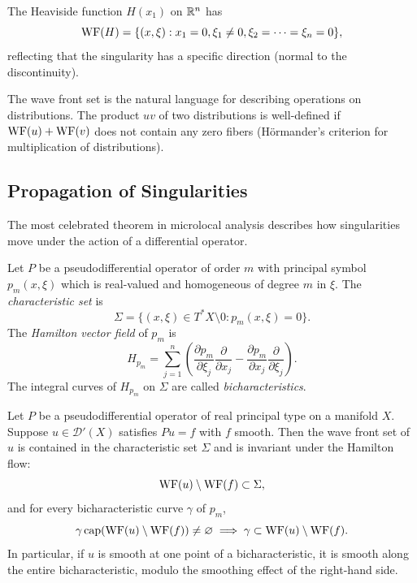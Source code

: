 \begin{example}
The Heaviside function \(H(x_1)\) on \(\mathbb{R}^n\) has
\[
\operatorname{WF}(H) = \{(x, \xi) : x_1 = 0, \xi_1 \neq 0, \xi_2 = \cdots = \xi_n = 0\},
\]
reflecting that the singularity has a specific direction (normal to
the discontinuity).
\end{example}

The wave front set is the natural language for describing operations on
distributions. The product \(uv\) of two distributions is well-defined
if \(\operatorname{WF}(u) + \operatorname{WF}(v)\) does not contain any zero fibers (H\"ormander's
criterion for multiplication of distributions).

\subsection{Propagation of Singularities}

The most celebrated theorem in microlocal analysis describes how
singularities move under the action of a differential operator.

Let \(P\) be a pseudodifferential operator of order \(m\) with principal
symbol \(p_m(x,\xi)\) which is real-valued and homogeneous of degree
\(m\) in \(\xi\). The \textit{characteristic set} is
\[
\Sigma = \{(x,\xi) \in T^*X \setminus 0 : p_m(x,\xi) = 0\}.
\]
The \textit{Hamilton vector field} of \(p_m\) is
\[
H_{p_m} = \sum_{j=1}^n \left(\frac{\partial p_m}{\partial \xi_j}
\frac{\partial}{\partial x_j} - \frac{\partial p_m}{\partial x_j}
\frac{\partial}{\partial \xi_j}\right).
\]
The integral curves of \(H_{p_m}\) on \(\Sigma\) are called
\textit{bicharacteristics}.

\begin{theorem}
Let \(P\) be a pseudodifferential operator of real principal type on a
manifold \(X\). Suppose \(u \in \mathcal{D}'(X)\) satisfies
\(Pu = f\) with \(f\) smooth. Then the wave front set of \(u\) is
contained in the characteristic set \(\Sigma\) and is invariant under
the Hamilton flow:
\[
\operatorname{WF}(u) \setminus \operatorname{WF}(f) \subset \Sigma,
\]
and for every bicharacteristic curve \(\gamma\) of \(p_m\),
\[
\gamma \operatorname{\mathrm{cap}} (\operatorname{WF}(u) \setminus \operatorname{WF}(f)) \neq \varnothing
\;\Longrightarrow\; \gamma \subset \operatorname{WF}(u) \setminus \operatorname{WF}(f).
\]
In particular, if \(u\) is smooth at one point of a bicharacteristic,
it is smooth along the entire bicharacteristic, modulo the smoothing
effect of the right-hand side.
\end{theorem}


